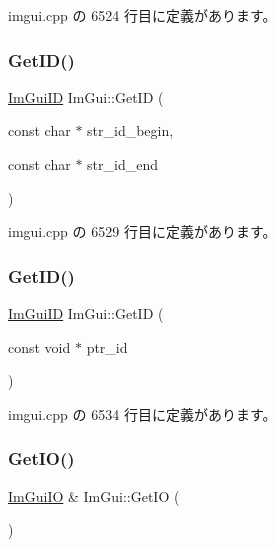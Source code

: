  imgui.\+cpp の 6524 行目に定義があります。

\mbox{\label{namespace_im_gui_a26064d74efebef3aa86e1a78b3e4c333}} 
\subsubsection{\texorpdfstring{Get\+I\+D()}{GetID()}\hspace{0.1cm}{\footnotesize\ttfamily [2/3]}}
{\footnotesize\ttfamily \mbox{\hyperlink{imgui_8h_a1785c9b6f4e16406764a85f32582236f}{Im\+Gui\+ID}} Im\+Gui\+::\+Get\+ID (\begin{DoxyParamCaption}\item[{const char $\ast$}]{str\+\_\+id\+\_\+begin,  }\item[{const char $\ast$}]{str\+\_\+id\+\_\+end }\end{DoxyParamCaption})}



 imgui.\+cpp の 6529 行目に定義があります。

\mbox{\label{namespace_im_gui_a220123ad62c2180ded92b2ef91f27c5a}} 
\subsubsection{\texorpdfstring{Get\+I\+D()}{GetID()}\hspace{0.1cm}{\footnotesize\ttfamily [3/3]}}
{\footnotesize\ttfamily \mbox{\hyperlink{imgui_8h_a1785c9b6f4e16406764a85f32582236f}{Im\+Gui\+ID}} Im\+Gui\+::\+Get\+ID (\begin{DoxyParamCaption}\item[{const void $\ast$}]{ptr\+\_\+id }\end{DoxyParamCaption})}



 imgui.\+cpp の 6534 行目に定義があります。

\mbox{\label{namespace_im_gui_a3179e560812f878f3961ce803a5d9302}} 
\subsubsection{\texorpdfstring{Get\+I\+O()}{GetIO()}}
{\footnotesize\ttfamily \mbox{\hyperlink{struct_im_gui_i_o}{Im\+Gui\+IO}} \& Im\+Gui\+::\+Get\+IO (\begin{DoxyParamCaption}{ }\end{DoxyParamCaption})}



